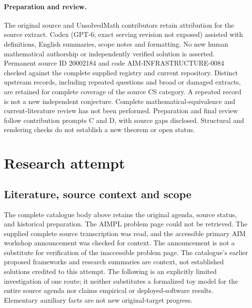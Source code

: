 \documentclass[11pt]{article}
\begin{document}
\paragraph{Preparation and review.}
The original source and UnsolvedMath contributors retain attribution for the source extract. Codex (GPT-6; exact serving revision not exposed) assisted with definitions, English summaries, scope notes and formatting. No new human mathematical authorship or independently verified solution is asserted. Permanent source ID 20002184 and code AIM-INFRASTRUCTURE-0084 checked against the complete supplied registry and current repository. Distinct upstream records, including repeated questions and broad or damaged extracts, are retained for complete coverage of the source CS category. A repeated record is not a new independent conjecture. Complete mathematical-equivalence and current-literature review has not been performed. Preparation and final review follow contribution prompts C and D, with source gaps disclosed. Structural and rendering checks do not establish a new theorem or open status.
\label{end:20002184}

\section{Research attempt}
\subsection{Literature, source context and scope}
The complete catalogue body above retains the original agenda, source status, and historical preparation. The AIMPL problem page could not be retrieved. The supplied complete source transcription was read, and the accessible primary AIM workshop announcement was checked for context. The announcement is not a substitute for verification of the inaccessible problem page. The catalogue's earlier proposed frameworks and research summaries are context, not established solutions credited to this attempt. The following is an explicitly limited investigation of one route; it neither substitutes a formalized toy model for the entire source agenda nor claims empirical or deployed-software results. Elementary auxiliary facts are not new original-target progress.
\end{document}
